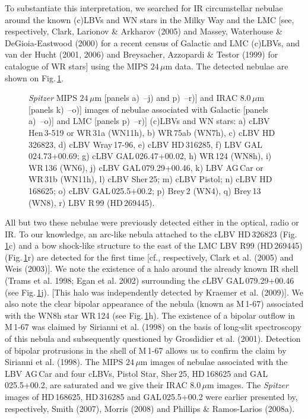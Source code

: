 \documentclass[useAMS]{mn2e}
\begin{document}
To substantiate this interpretation, we searched for IR
circumstellar nebulae around the known (c)LBVs and WN stars in the
Milky Way and the LMC [see, respectively, Clark, Larionov \&
Arkharov (2005) and Massey, Waterhouse \& DeGioia-Eastwood (2000)
for a recent census of Galactic and LMC (c)LBVs, and van der Hucht
(2001, 2006) and Breysacher, Azzopardi \& Testor (1999) for
catalogue of WR stars] using the MIPS $24\,\mu$m data. The detected
nebulae are shown on Fig.\,\ref{fig:known}.
%
\begin{figure}%
\caption{{\it Spitzer} MIPS $24 \, \mu$m [panels a)~--j) and
p)~--r)] and IRAC $8.0\,\mu$m [panels k)~--o)] images of nebulae
associated with Galactic [panels a)~--o)] and LMC [panels p)~--r)]
(c)LBVs and WN stars: a) cLBV Hen\,3-519 or WR\,31a (WN11h), b) WR\,75ab
(WN7h), c) cLBV HD\,326823, d) cLBV Wray\,17-96, e) cLBV HD\,316285,
f) LBV GAL\,024.73+00.69; g) cLBV GAL\,026.47+00.02, h) WR\,124 (WN8h),
i) WR\,136 (WN6), j) cLBV GAL\,079.29+00.46, k) LBV AG\,Car or WR\,31b
(WN11h), l) cLBV Sher\,25; m) cLBV Pistol; n) cLBV HD\,168625; o) cLBV GAL\,025.5+00.2;
p) Brey\,2 (WN4), q) Brey\,13 (WN8), r) LBV R\,99 (HD\,269445).
} \label{fig:known}
\end{figure}
All but two these nebulae were previously detected either in the
optical, radio or IR. To our knowledge, an arc-like nebula attached
to the cLBV HD\,326823 (Fig.\,\ref{fig:known}c) and a bow shock-like
structure to the east of the LMC LBV R99 (HD\,269445)
(Fig.\,\ref{fig:known}r) are detected for the first time [cf.,
respectively, Clark et al. (2005) and Weis (2003)]. We note the
existence of a halo around the already known IR shell (Trams et al.
1998; Egan et al. 2002) surrounding the cLBV GAL\,079.29+00.46 (see
Fig.\,\ref{fig:known}j). [This halo was independently detected by
Kraemer et al. (2009)]. We also note the clear bipolar appearance of
the nebula (known as M\,1-67) associated with the WN8h star WR\,124
(see Fig.\,\ref{fig:known}h). The existence of a bipolar outflow in
M\,1-67 was claimed by Sirianni et al. (1998) on the basis of
long-slit spectroscopy of this nebula and subsequently questioned by
Grosdidier et al. (2001). Detection of bipolar protrusions in the
shell of M\,1-67 allows us to confirm the claim by Sirianni et al.
(1998). The MIPS $24 \, \mu$m images of nebulae associated with the
LBV AG\,Car and four cLBVs, Pistol Star, Sher\,25, HD\,168625 and
GAL\,025.5+00.2, are saturated and we give their IRAC $8.0\,\mu$m
images. The {\it Spitzer} images of HD\,168625, HD\,316285 and
GAL\,025.5+00.2 were earlier presented by, respectively, Smith
(2007), Morris (2008) and Phillips \& Ramos-Larios (2008a).
\end{document}
